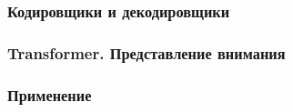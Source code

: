 


\subsubsection{Кодировщики и декодировщики}



\subsubsection{Transformer. Представление внимания}




\subsubsection{Применение}

